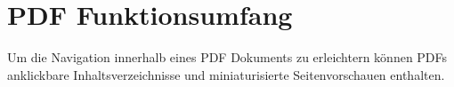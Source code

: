 \section{PDF Funktionsumfang}
Um die Navigation innerhalb eines PDF Dokuments zu erleichtern können PDFs anklickbare Inhaltsverzeichnisse und miniaturisierte Seitenvorschauen enthalten.